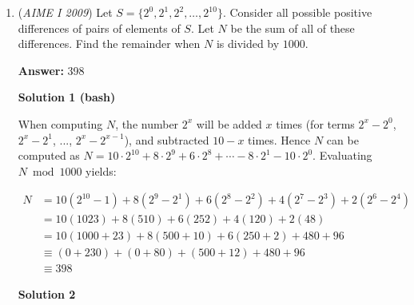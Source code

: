 \begin{enumerate}
\textbf{Solution 4 (Easier Explicit)}

Note that 

 
 \[5^{a_{n+1} - a_n} = \frac{3n+5}{3n+2}\]
 \[a_{n+1} - a_n = \log_{5}(\frac{3n+5}{3n+2})\]
 \[a_{n+1} = \log_{5}(\frac{3n+5}{3n+2}) + a_n\].

 So,

 
 \[a_{n+1} = \log_{5}(\frac{3n+5}{3n+2}) + \log_{5}(\frac{3(n-1)+5}{3(n-1)+2}) + \dots +  \log_{5}(\frac{8}{5}) + a_1\]

 in which we see telescopes to 

 
 \[a_{n+1} = \log_{5}(\frac{3n+5}{5})\]

 Now, we must find the smallest $n$ for which $\log_{5}(\frac{3n+5}{5}) \in \mathbb{Z} \neq 1, n \in \mathbb{Z}^+ \neq 0$. We first check $\frac{3n+5}{5} = 5$, but see that $n$ is not an integer, so we check $\frac{3n+5}{5} = 25$, so $3n = 120$, $n = 40$. The index $k = n+1$ implies $k = \boxed{041}$.

 


	\item (\textit{AIME I 2009}) Let $S = \{2^0,2^1,2^2,\ldots,2^{10}\}$. Consider all possible positive differences of pairs of elements of $S$. Let $N$ be the sum of all of these differences. Find the remainder when $N$ is divided by $1000$.


 
 \textbf{Answer: }398



\textbf{Solution 1 (bash)}

When computing $N$, the number $2^x$ will be added $x$ times (for terms $2^x-2^0$, $2^x-2^1$, ..., $2^x - 2^{x-1}$), and subtracted $10-x$ times. Hence $N$ can be computed as $N=10\cdot 2^{10} + 8\cdot 2^9 + 6\cdot 2^8 + \cdots - 8\cdot 2^1 - 10\cdot 2^0$. Evaluating $N \bmod {1000}$ yields:

 
 \begin{align*} N  & = 10(2^{10}-1) + 8(2^9 - 2^1) + 6(2^8-2^2) + 4(2^7-2^3) + 2(2^6-2^4) \\ & = 10(1023) + 8(510) + 6(252) + 4(120) + 2(48) \\ & = 10(1000+23) + 8(500+10) + 6(250+2) + 480 + 96 \\ & \equiv (0 + 230) + (0 + 80) + (500 + 12) + 480 + 96 \\ & \equiv \boxed{398} \end{align*}





\textbf{Solution 2}


\end{enumerate}
